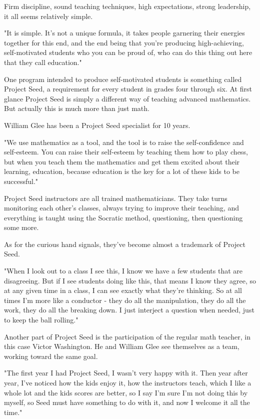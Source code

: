 Firm discipline, sound teaching techniques, high expectations, strong leadership, it all seems relatively simple.

"It is simple. It's not a unique formula, it takes people garnering their energies together for this end, and the end being that you're producing high-achieving, self-motivated students who you can be proud of, who can do this thing out here that they call education."

One program intended to produce self-motivated students is something called Project Seed, a requirement for every student in grades four through six. At first glance Project Seed is simply a different way of teaching advanced mathematics. But actually this is much more than just math.

William Glee has been a Project Seed specialist for 10 years.

"We use mathematics as a tool, and the tool is to raise the self-confidence and self-esteem. You can raise their self-esteem by teaching them how to play chess, but when you teach them the mathematics and get them excited about their learning, education, because education is the key for a lot of these kids to be successful."

Project Seed instructors are all trained mathematicians. They take turns monitoring each other's classes, always trying to improve their teaching, and everything is taught using the Socratic method, questioning, then questioning some more.

As for the curious hand signals, they've become almost a trademark of Project Seed.

"When I look out to a class I see this, I know we have a few students that are disagreeing. But if I see students doing like this, that means I know they agree, so at any given time in a class, I can see exactly what they're thinking. So at all times I'm more like a conductor - they do all the manipulation, they do all the work, they do all the breaking down. I just interject a question when needed, just to keep the ball rolling."

Another part of Project Seed is the participation of the regular math teacher, in this case Victor Washington. He and William Glee see themselves as a team, working toward the same goal.

"The first year I had Project Seed, I wasn't very happy with it. Then year after year, I've noticed how the kids enjoy it, how the instructors teach, which I like a whole lot and the kids scores are better, so I say I'm sure I'm not doing this by myself, so Seed must have something to do with it, and now I welcome it all the time."

